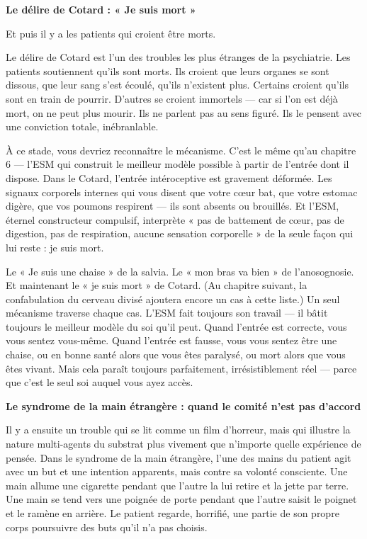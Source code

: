 \documentclass[11pt, twoside, openright]{book}
\begin{document}
\textbf{Le délire de Cotard : « Je suis mort »}

Et puis il y a les patients qui croient être morts.

Le délire de Cotard est l'un des troubles les plus étranges de la psychiatrie. Les patients soutiennent qu'ils sont morts. Ils croient que leurs organes se sont dissous, que leur sang s'est écoulé, qu'ils n'existent plus. Certains croient qu'ils sont en train de pourrir. D'autres se croient immortels --- car si l'on est déjà mort, on ne peut plus mourir. Ils ne parlent pas au sens figuré. Ils le pensent avec une conviction totale, inébranlable.

À ce stade, vous devriez reconnaître le mécanisme. C'est le même qu'au chapitre 6 --- l'ESM qui construit le meilleur modèle possible à partir de l'entrée dont il dispose. Dans le Cotard, l'entrée intéroceptive est gravement déformée. Les signaux corporels internes qui vous disent que votre cœur bat, que votre estomac digère, que vos poumons respirent --- ils sont absents ou brouillés. Et l'ESM, éternel constructeur compulsif, interprète « pas de battement de cœur, pas de digestion, pas de respiration, aucune sensation corporelle » de la seule façon qui lui reste : je suis mort.

Le « Je suis une chaise » de la salvia. Le « mon bras va bien » de l'anosognosie. Et maintenant le « je suis mort » de Cotard. (Au chapitre suivant, la confabulation du cerveau divisé ajoutera encore un cas à cette liste.) Un seul mécanisme traverse chaque cas. L'ESM fait toujours son travail --- il bâtit toujours le meilleur modèle du soi qu'il peut. Quand l'entrée est correcte, vous vous sentez vous-même. Quand l'entrée est fausse, vous vous sentez être une chaise, ou en bonne santé alors que vous êtes paralysé, ou mort alors que vous êtes vivant. Mais cela paraît toujours parfaitement, irrésistiblement réel --- parce que c'est le seul soi auquel vous ayez accès.

\textbf{Le syndrome de la main étrangère : quand le comité n'est pas d'accord}

Il y a ensuite un trouble qui se lit comme un film d'horreur, mais qui illustre la nature multi-agents du substrat plus vivement que n'importe quelle expérience de pensée. Dans le syndrome de la main étrangère, l'une des mains du patient agit avec un but et une intention apparents, mais contre sa volonté consciente. Une main allume une cigarette pendant que l'autre la lui retire et la jette par terre. Une main se tend vers une poignée de porte pendant que l'autre saisit le poignet et le ramène en arrière. Le patient regarde, horrifié, une partie de son propre corps poursuivre des buts qu'il n'a pas choisis.
\end{document}
